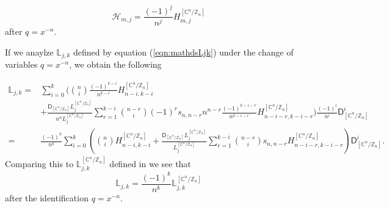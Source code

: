 \documentclass[12pt]{amsart}
\numberwithin{equation}{section}
\newcommand{\CnZn}{[\mathbb{C}^n/\mathbb{Z}_n]}
\begin{document}
\begin{equation*}
\mathcal{H}_{m, j}=\frac{(-1)^j}{n^j}H_{m,j}^{\CnZn}
\end{equation*}
after $q=x^{-n}$.

If we anaylze $\mathds{L}_{j,k}$ defined by equation (\ref{eqn:mathdsLjk}) under the change of variables $q=x^{-n}$, we obtain the following

\begin{equation*}
\begin{aligned}
\mathds{L}_{j,k}
=&\sum_{i=0}^{k}\Bigg(\binom{n}{i} \frac{(-1)^{k-i}}{n^{k-i}}{H}^{\CnZn}_{n-i, k-i}\\ 
&+\frac{\mathsf{D}_{\CnZn}L_j^{\CnZn}}{n^{n}L_j^{\CnZn}} \sum_{r=1}^{k-i}\binom{n-r}{i} (-1)^r s_{n, n-r}n^{n-r} \frac{(-1)^{k-i-r}}{n^{k-i-r}}{H}^{\CnZn}_{n-i-r, k-i-r}\Bigg) \frac{(-1)^i}{n^i}\mathsf{D}_{\CnZn}^{i}\\
=&\frac{(-1)^k}{n^k}\sum_{i=0}^{k}\left(\binom{n}{i}{H}^{\CnZn}_{n-i, k-i}+\frac{\mathsf{D}_{\CnZn}L_j^{\CnZn}}{L_j^{\CnZn}} \sum_{r=1}^{k-i}\binom{n-r}{i} s_{n, n-r}{H}^{\CnZn}_{n-i-r, k-i-r}\right)\mathsf{D}_{\CnZn}^{i}.
\end{aligned}
\end{equation*}
Comparing this to $\mathds{L}_{j,k}^{\CnZn}$ defined in \cite[Appendix]{gt} we see that 
\begin{equation}
\mathds{L}_{j,k}=\frac{(-1)^k}{n^k}\mathds{L}_{j,k}^{\CnZn}  
\end{equation}
after the identification $q=x^{-n}$.
\end{document}
